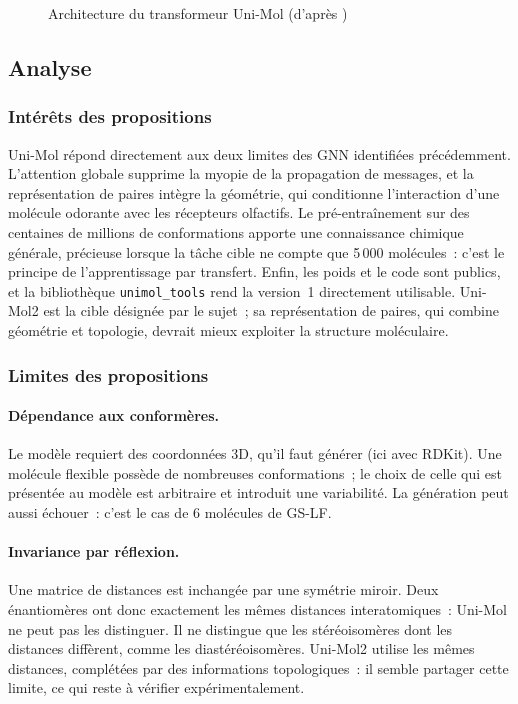 \begin{figure}
   \centering
   \caption{Architecture du transformeur Uni-Mol (d'après \cite{Zhou-2023})}
   \label{fig:UniMol}
\end{figure}

\subsection{Analyse}

\subsubsection{Intérêts des propositions}

Uni-Mol répond directement aux deux limites des GNN identifiées précédemment.
L'attention globale supprime la myopie de la propagation de messages, et la représentation de paires intègre la géométrie, qui conditionne l'interaction d'une molécule odorante avec les récepteurs olfactifs.
Le pré-entraînement sur des centaines de millions de conformations apporte une connaissance chimique générale, précieuse lorsque la tâche cible ne compte que 5\,000 molécules~: c'est le principe de l'apprentissage par transfert.
Enfin, les poids et le code sont publics, et la bibliothèque \texttt{unimol\_tools} rend la version~1 directement utilisable.
Uni-Mol2 est la cible désignée par le sujet~; sa représentation de paires, qui combine géométrie et topologie, devrait mieux exploiter la structure moléculaire.

\subsubsection{Limites des propositions}

\paragraph{Dépendance aux conformères.}
Le modèle requiert des coordonnées 3D, qu'il faut générer (ici avec RDKit).
Une molécule flexible possède de nombreuses conformations~; le choix de celle qui est présentée au modèle est arbitraire et introduit une variabilité.
La génération peut aussi échouer~: c'est le cas de 6 molécules de GS-LF.

\paragraph{Invariance par réflexion.}
Une matrice de distances est inchangée par une symétrie miroir.
Deux énantiomères ont donc exactement les mêmes distances interatomiques~: Uni-Mol ne peut pas les distinguer.
Il ne distingue que les stéréoisomères dont les distances diffèrent, comme les diastéréoisomères.
Uni-Mol2 utilise les mêmes distances, complétées par des informations topologiques~: il semble partager cette limite, ce qui reste à vérifier expérimentalement.

